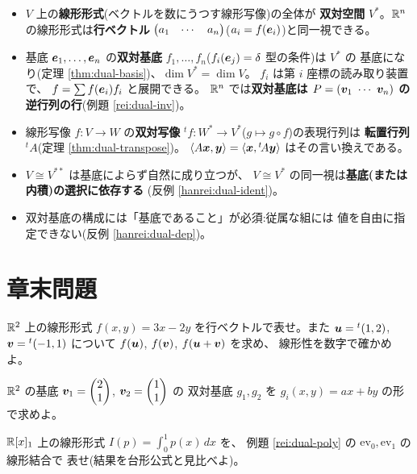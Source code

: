 \begin{matome}
\begin{itemize}
\item $V$ 上の\textbf{線形形式}(ベクトルを数にうつす線形写像)の全体が
\textbf{双対空間} $V^{*}$。$\mathbb{R}^n$ の線形形式は\textbf{行ベクトル}
$\begin{pmatrix}a_1 & \cdots & a_n\end{pmatrix}$($a_i = f(\bm{e}_i)$)と同一視できる。
\item 基底 $\bm{e}_1, \dots, \bm{e}_n$ の\textbf{双対基底}
$f_1, \dots, f_n$($f_i(\bm{e}_j) = \delta$ 型の条件)は $V^{*}$ の
基底になり(定理 \ref{thm:dual-basis})、$\dim V^{*} = \dim V$。
$f_i$ は第 $i$ 座標の読み取り装置で、
$f = \sum f(\bm{e}_i) f_i$ と展開できる。
$\mathbb{R}^n$ では\textbf{双対基底は $P = (\vect{v}_1\ \cdots\ \vect{v}_n)$ の
逆行列の行}(例題 \ref{rei:dual-inv})。
\item 線形写像 $f : V \to W$ の\textbf{双対写像}
${}^tf : W^{*} \to V^{*}$($g \mapsto g \circ f$)の表現行列は
\textbf{転置行列} ${}^t\!A$(定理 \ref{thm:dual-transpose})。
$\langle A\bm{x}, \bm{y} \rangle = \langle \bm{x},
{}^t\!A\bm{y} \rangle$ はその言い換えである。
\item $V \cong V^{**}$ は基底によらず自然に成り立つが、
$V \cong V^{*}$ の同一視は\textbf{基底(または内積)の選択に依存する}
(反例 \ref{hanrei:dual-ident})。
\item 双対基底の構成には「基底であること」が必須:従属な組には
値を自由に指定できない(反例 \ref{hanrei:dual-dep})。
\end{itemize}
\end{matome}

\section*{章末問題}

\begin{mondai}[基本]\label{q:dual-ex1}
$\mathbb{R}^2$ 上の線形形式 $f(x, y) = 3x - 2y$ を行ベクトルで表せ。また
$\bm{u} = {}^t(1, 2)$, $\bm{v} = {}^t(-1, 1)$ について
$f(\bm{u})$, $f(\bm{v})$, $f(\bm{u} + \bm{v})$ を求め、
線形性を数字で確かめよ。
\end{mondai}

\begin{mondai}[基本]\label{q:dual-ex2}
$\mathbb{R}^2$ の基底 $\bm{v}_1 = \begin{pmatrix}2 \\ 1\end{pmatrix}$, $\bm{v}_2 = \begin{pmatrix}1 \\ 1\end{pmatrix}$ の
双対基底 $g_1, g_2$ を $g_i(x, y) = ax + by$ の形で求めよ。
\end{mondai}

\begin{mondai}[基本]\label{q:dual-ex3}
$\mathbb{R}[x]_1$ 上の線形形式 $I(p) = \displaystyle\int_0^1 p(x)\,dx$ を、
例題 \ref{rei:dual-poly} の $\mathrm{ev}_0, \mathrm{ev}_1$ の線形結合で
表せ(結果を台形公式と見比べよ)。
\end{mondai}

